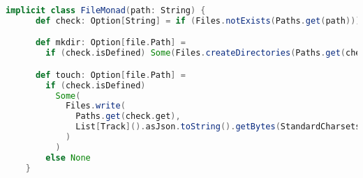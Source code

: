\begin{lstlisting}[language=Scala, caption=Monade per le operazioni di setup, label=lst:setup]
implicit class FileMonad(path: String) {
      def check: Option[String] = if (Files.notExists(Paths.get(path))) Some(path) else None

      def mkdir: Option[file.Path] =
        if (check.isDefined) Some(Files.createDirectories(Paths.get(check.get))) else None

      def touch: Option[file.Path] =
        if (check.isDefined)
          Some(
            Files.write(
              Paths.get(check.get),
              List[Track]().asJson.toString().getBytes(StandardCharsets.UTF_8)
            )
          )
        else None
    }
\end{lstlisting}